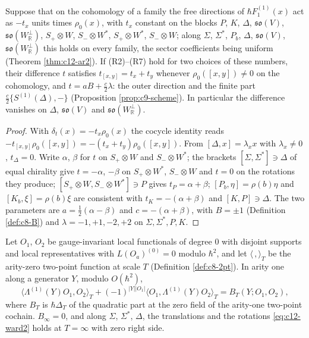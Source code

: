 \begin{proposition}
\label{prop:c12-tfix}
Suppose that on the cohomology of a family the free directions of $\hbar F_1^{(1)}(x)$ act as $-t_x$ units times $\rho_0(x)$, with $t_x$ constant on the blocks $P$, $K$, $\Delta$, $\mathfrak{so}(V)$, $\mathfrak{so}(W_{\mathbb R}^\perp)$, $S_+\otimes W$, $S_-\otimes W^*$, $S_+\otimes W^*$, $S_-\otimes W$; along $\Sigma$, $\Sigma^*$, $P_b$, $\Delta$, $\mathfrak{so}(V)$, $\mathfrak{so}(W_{\mathbb R}^\perp)$ this holds on every family, the sector coefficients being uniform (Theorem \ref{thm:c12-ar2}). If (R2)--(R7) hold for two choices of these numbers, their difference $t$ satisfies $t_{[x,y]}=t_x+t_y$ whenever $\rho_0([x,y])\neq0$ on the cohomology, and $t=aB+\tfrac c2\lambda$: the outer direction and the finite part $\tfrac c2\{S^{(1)}(\Delta),-\}$ (Proposition \ref{prop:c9-scheme}). In particular the difference vanishes on $\Delta$, $\mathfrak{so}(V)$ and $\mathfrak{so}(W_{\mathbb R}^\perp)$.
\end{proposition}

\begin{proof}
With $\delta_t(x)=-t_x\rho_0(x)$ the cocycle identity reads $-t_{[x,y]}\rho_0([x,y])=-(t_x+t_y)\rho_0([x,y])$. From $[\Delta,x]=\lambda_xx$ with $\lambda_x\neq0$, $t_\Delta=0$. Write $\alpha$, $\beta$ for $t$ on $S_+\otimes W$ and $S_-\otimes W^*$; the brackets $[\Sigma,\Sigma^*]\ni\Delta$ of equal chirality give $t=-\alpha$, $-\beta$ on $S_+\otimes W^*$, $S_-\otimes W$ and $t=0$ on the rotations they produce; $[S_+\otimes W,S_-\otimes W^*]\ni P$ gives $t_P=\alpha+\beta$; $[P_b,\eta]=\rho(b)\eta$ and $[K_b,\xi]=\rho(b)\xi$ are consistent with $t_K=-(\alpha+\beta)$ and $[K,P]\ni\Delta$. The two parameters are $a=\tfrac12(\alpha-\beta)$ and $c=-(\alpha+\beta)$, with $B=\pm1$ (Definition \ref{def:c8-B}) and $\lambda=-1,+1,-2,+2$ on $\Sigma,\Sigma^*,P,K$.
\end{proof}

\begin{lemma}
\label{lem:c12-ward2}
Let $O_1$, $O_2$ be gauge-invariant local functionals of degree $0$ with disjoint supports and local representatives with $L(O_a)^{(0)}=0$ modulo $\hbar^2$, and let $\langle\,,\rangle_T$ be the arity-zero two-point function at scale $T$ (Definition \ref{def:c8-2pt}). In arity one along a generator $Y$, modulo $O(\hbar^2)$,
\begin{equation}
\big\langle\Lambda^{(1)}(Y)O_1,O_2\big\rangle_T+(-1)^{|Y||O_1|}\big\langle O_1,\Lambda^{(1)}(Y)O_2\big\rangle_T=B_T(Y;O_1,O_2),
\label{eq:c12-ward2}
\end{equation}
where $B_T$ is $\hbar\Delta_T$ of the quadratic part at the zero field of the arity-one two-point cochain. $B_\infty=0$, and along $\Sigma$, $\Sigma^*$, $\Delta$, the translations and the rotations \eqref{eq:c12-ward2} holds at $T=\infty$ with zero right side.
\end{lemma}

